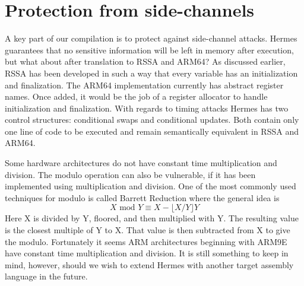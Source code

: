 \clearpage
\newpage

\section{Protection from side-channels}
A key part of our compilation is to protect against side-channel attacks.
Hermes guarantees that no sensitive information will be left in memory after execution, but what about after translation to RSSA and ARM64?
As discussed earlier, RSSA has been developed in such a way that every variable has an initialization and finalization.
The ARM64 implementation currently has abstract register names.
Once added, it would be the job of a register allocator to handle initialization and finalization.
With regards to timing attacks Hermes has two control structures: conditional swaps and conditional updates.
Both contain only one line of code to be executed and remain semantically equivalent in RSSA and ARM64.

Some hardware architectures do not have constant time multiplication and division.
The modulo operation can also be vulnerable, if it has been implemented using multiplication and division.
One of the most commonly used techniques for modulo is called Barrett Reduction\cite{mod_without_mod} where the general idea is
\begin{equation*}
  X \text{ mod } Y \equiv X - \lfloor{ X / Y }\rfloor Y
\end{equation*}
Here X is divided by Y, floored, and then multiplied with Y. The resulting value is the closest multiple of Y to X. That value is then subtracted from X to give the modulo. 
Fortunately it seems ARM architectures beginning with ARM9E have constant time multiplication and division\cite{bearssl}.
It is still something to keep in mind, however, should we wish to extend Hermes with another target assembly language in the future.
